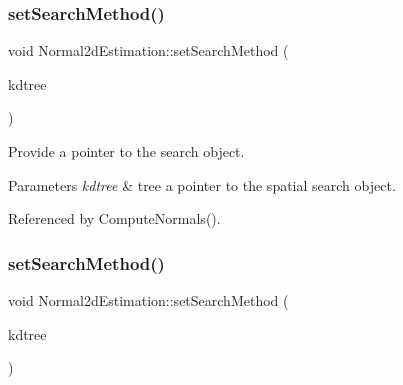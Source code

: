 \subsubsection{\texorpdfstring{set\+Search\+Method()}{setSearchMethod()}\hspace{0.1cm}{\footnotesize\ttfamily [1/2]}}
{\footnotesize\ttfamily void Normal2d\+Estimation\+::set\+Search\+Method (\begin{DoxyParamCaption}\item[{const \hyperlink{Normal2dEstimation_8h_a8b809d6f98757c822d529e8f675940cd}{Ptrkd\+Tree} \&}]{kdtree }\end{DoxyParamCaption})\hspace{0.3cm}{\ttfamily [inline]}}



Provide a pointer to the search object. 


\begin{DoxyParams}{Parameters}
{\em kdtree} & tree a pointer to the spatial search object. \\
\hline
\end{DoxyParams}


Referenced by Compute\+Normals().

\mbox{\label{classNormal2dEstimation_a87261649c17ea4f561da89066591a900}} 
\subsubsection{\texorpdfstring{set\+Search\+Method()}{setSearchMethod()}\hspace{0.1cm}{\footnotesize\ttfamily [2/2]}}
{\footnotesize\ttfamily void Normal2d\+Estimation\+::set\+Search\+Method (\begin{DoxyParamCaption}\item[{const \hyperlink{Normal2dEstimation_8h_a8b809d6f98757c822d529e8f675940cd}{Ptrkd\+Tree} \&}]{kdtree }\end{DoxyParamCaption})\hspace{0.3cm}{\ttfamily [inline]}}

\mbox{\label{classNormal2dEstimation_ad05b65f35c4aa0b1511bf81e5a70b36d}} 
